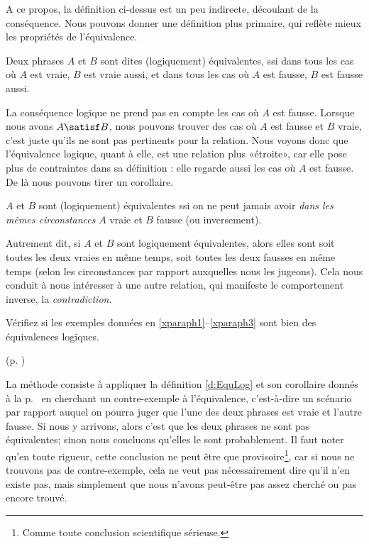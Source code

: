 \begin{refsegment}
A ce propos, la définition ci-dessus est un peu indirecte, découlant
de la conséquence.  Nous pouvons donner une définition plus primaire,
qui reflète mieux les propriétés de l'équivalence.

\begin{defi} \label{d:EquLog}
Deux phrases $A$ et $B$ sont dites (logiquement) équivalentes,  ssi
dans tous les cas où $A$ est vraie, $B$ est vraie aussi, et dans tous
les cas où $A$ est fausse, $B$ est fausse aussi\footnotemark.
\end{defi}%

La conséquence logique ne prend pas en compte les cas où $A$ est
fausse. Lorsque nous avons $A\satisf B$, nous pouvons trouver des cas où $A$ est
fausse et $B$ vraie, c'est juste qu'ils ne sont pas pertinents pour
la relation.  Nous voyons donc que l'équivalence logique, quant à elle,  est une relation
plus «étroite», car elle pose plus de contraintes dans sa
définition : elle regarde aussi les cas où $A$ est fausse.
De là nous pouvons tirer un corollaire.




\begin{coro}
$A$ et $B$ sont  (logiquement) équivalentes ssi on ne peut
jamais avoir \emph{dans les mêmes circonstances} $A$ vraie et $B$ fausse (ou
inversement).
\end{coro}


Autrement dit, si $A$ et $B$ sont logiquement équivalentes, alors elles sont soit toutes les deux vraies en même temps, soit toutes les deux fausses en même temps (selon les circonstances par rapport auxquelles nous les jugeons). 
Cela nous conduit à nous intéresser à une autre relation, qui manifeste le comportement inverse, la \emph{contradiction}.


\begin{exo}\label{exo:1EqLog}
Vérifiez si les exemples données en \ref{xparaph1}--\ref{xparaph3}
sont bien des équivalences logiques.
\begin{solu} (p. \pageref{exo:1EqLog})

La méthode consiste à appliquer la définition \ref{d:EquLog} et son corollaire donnés à la p.~\pageref{d:EquLog} en cherchant un contre-exemple à l'équivalence, c'est-à-dire un scénario par rapport auquel on pourra juger que l'une des deux phrases est vraie et l'autre fausse.  Si nous y arrivons, alors c'est que les deux phrases ne sont pas équivalentes; sinon nous concluons qu'elles le sont probablement.  Il faut noter qu'en toute rigueur,  cette conclusion  ne peut être que provisoire\footnote{Comme toute conclusion scientifique sérieuse.}, car si nous ne trouvons pas de contre-exemple, cela ne veut pas nécessairement dire qu'il n'en existe pas, mais simplement que nous n'avons peut-être pas assez cherché ou pas encore trouvé.


\end{solu}
\end{exo}
\end{refsegment}
